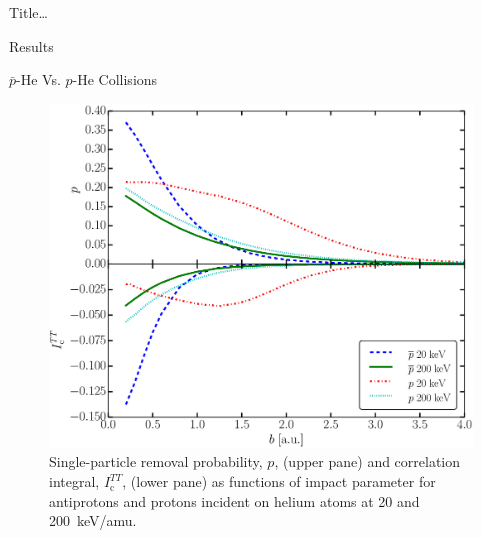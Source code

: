 \documentclass[letterpaper, 10 pt]{report}
\begin{document}
\begin{chapter}{ Title\dots \label{chap:p-he2p-he}}
\begin{section}{Results \label{sec:phe2p-res}}
\begin{subsection}{ \texorpdfstring{$\bar{p}$}{pbar}-He Vs. \texorpdfstring{$p$}{p}-He Collisions
                         \label{sec:pbarhe-res}}
         \begin{figure}[htp]
            \centering
            \includegraphics[width = 0.49\linewidth]{./images/p-ic.eps}
            \caption[Single-particle removal and correlation integral]
                    {Single-particle removal probability, $p$, (upper pane) and
                     correlation integral, $I_\mathrm{c}^{TT}$, (lower pane) as functions of impact
                     parameter for antiprotons and protons incident on helium atoms at 20 and
                     200~keV/amu. \label{fig:p-ic}}
         \end{figure}

         \begin{figure}[ht]
            \begin{minipage}{.49\linewidth}
               

\end{minipage}
\end{figure}
\end{subsection}
\end{section}
\end{chapter}
\end{document}
